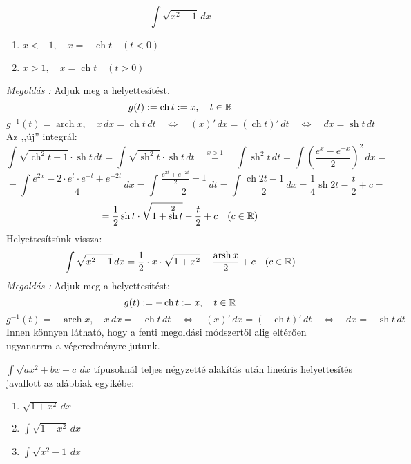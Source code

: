 \documentclass[a4paper,11.5pt]{article}
\DeclareMathOperator{\sh}{sh}
\DeclareMathOperator{\ch}{ch}
\DeclareMathOperator{\arsh}{arsh}
\DeclareMathOperator{\arch}{arch}
\begin{document}
	\begin{exercise}
		\[ \int\sqrt{x^2-1}\,dx \]
		\begin{enumerate}
			\item $x<-1,\quad x=-\ch t \quad (t<0)$
			\item $x>1,\quad x=\ch t \quad (t>0)$
		\end{enumerate}
		\textit{Megoldás :} Adjuk meg a helyettesítést.
		\[ g(t):=\ch t:=x, \quad t\in\R \]
		\[ g^{-1}(t)=\arch x,\quad x\,dx=\ch t\,dt\quad \Leftrightarrow\quad (x)'\,dx=(\ch t)'\,dt\quad \Leftrightarrow\quad dx=\sh t\,dt \]
		Az ,,új'' integrál:
		\[ \int\sqrt{\ch^2t-1}\cdot\sh t\,dt=\int\sqrt{\sh^2t}\cdot\sh t\,dt\quad \overset{x>1}{=}\quad \int\sh^2t\,dt=\int\left(\frac{e^x-e^{-x}}{2}\right)^2\,dx=\]
		\[=\int\frac{e^{2x}-2\cdot e^{t}\cdot e^{-t}+e^{-2t} }{4}\,dx=\int\frac{\frac{e^{2t}+e^{-2t}}{2}-1}{2}\,dt=\int\frac{\ch2t-1}{2}\,dx=\frac{1}{4}\sh2t-\frac{t}{2}+c=\]
		\[=\frac{1}{2}\sh t\cdot\sqrt{1+\sh^2 t}-\frac{t}{2}+c\quad (c\in\R) \]
		Helyettesítsünk vissza:
		\[ \int\sqrt{x^2-1}\,dx=\frac{1}{2}\cdot x\cdot\sqrt{1+x^2}-\frac{\arsh x}{2}+c\quad (c\in\R) \]
		\textit{Megoldás :} Adjuk meg a helyettesítést:
		\[ g(t):=-\ch t:=x, \quad t\in\R \]
		\[ g^{-1}(t)=-\arch x,\quad x\,dx=-\ch t\,dt\quad \Leftrightarrow\quad (x)'\,dx=(-\ch t)'\,dt\quad \Leftrightarrow\quad dx=-\sh t\,dt \]
		Innen könnyen látható, hogy a fenti megoldási módszertől alig eltérően ugyanarrra a végeredményre jutunk.
	\end{exercise}
	\begin{note}
		$\int\sqrt{ax^2+bx+c}\,dx$ típusoknál teljes négyzetté alakítás után lineáris helyettesítés javallott az alábbiak egyikébe:
		\begin{enumerate}
			\item $\sqrt{1+x^2}\,dx$
			\item $\int\sqrt{1-x^2}\,dx$
			\item $\int\sqrt{x^2-1}\,dx$
		\end{enumerate}
	\end{note}
\end{document}

